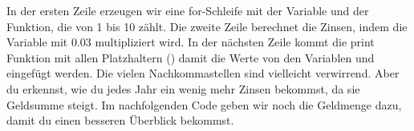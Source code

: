 In der ersten Zeile erzeugen wir eine for-Schleife mit der  Variable und der  Funktion, die von 1 bis 10 zählt. Die zweite Zeile berechnet die Zinsen, indem die Variable  mit 0.03 multipliziert wird. In der nächsten Zeile kommt die print Funktion mit allen Platzhaltern () damit die Werte von den Variablen  und  eingefügt werden.
Die vielen Nachkommastellen sind vielleicht verwirrend. Aber du erkennst, wie du jedes Jahr ein wenig mehr Zinsen bekommst, da sie Geldsumme steigt.
Im nachfolgenden Code geben wir noch die Geldmenge dazu, damit du einen besseren Überblick bekommst.

